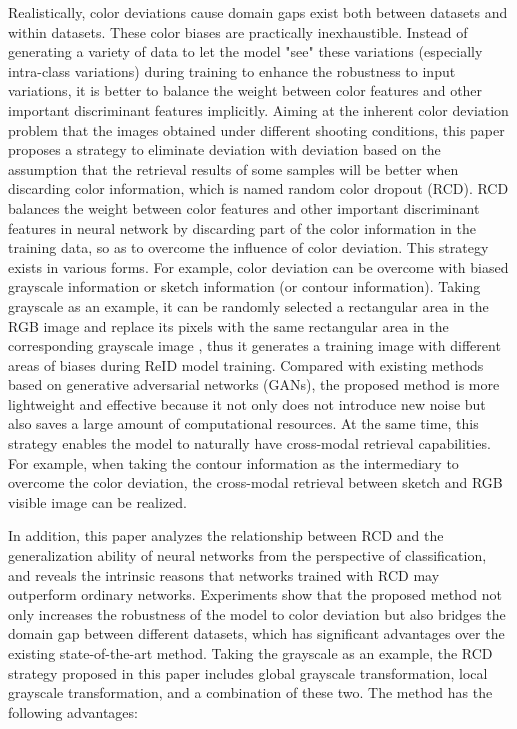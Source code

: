 \documentclass[10pt,twocolumn,letterpaper]{article}
\begin{document}
Realistically, color deviations cause domain gaps exist both between datasets and within datasets\cite{zheng2019joint,wei2018person}. These color biases are practically inexhaustible. Instead of generating a variety of data to let the model "see" these variations (especially intra-class variations)\cite{zheng2019joint} during training to enhance the robustness to input variations, it is better to balance the weight between color features and other important discriminant features implicitly. Aiming at the inherent color deviation problem that the images obtained under different shooting conditions, this paper proposes a strategy to eliminate deviation with deviation based on the assumption that the retrieval results of some samples will be better when discarding color information, which is named random color dropout (RCD). RCD balances the weight between color features and other important discriminant features in neural network by discarding part of the color information in the training data, so as to overcome the influence of color deviation. This strategy exists in various forms. For example, color deviation can be overcome with biased grayscale information or sketch information (or contour information). Taking grayscale as an example, it can be randomly selected a rectangular area in the RGB image and replace its pixels with the same rectangular area in the corresponding grayscale image , thus it generates a training image with different areas of biases during ReID model training. Compared with existing methods based on generative adversarial networks (GANs)\cite{goodfellow2014generative,zheng2019joint,wei2018person,zhong2018camera,deng2018image,liu2018pose,qian2018pose}, the proposed method is more lightweight and effective because it not only does not introduce new noise but also saves a large amount of computational resources. At the same time, this strategy enables the model to naturally have cross-modal retrieval\cite{sketch-criminal,sketch-based,zhu2020hetero,huang2022modality,ye2018visible,li2020infrared} capabilities. For example, when taking the contour information as the intermediary to overcome the color deviation, the cross-modal retrieval between sketch and RGB visible image can be realized.

In addition, this paper analyzes the relationship between RCD and the generalization ability of neural networks from the perspective of classification, and reveals the intrinsic reasons that networks trained with RCD may outperform ordinary networks. Experiments show that the proposed method not only increases the robustness of the model to color deviation but also bridges the domain gap between different datasets, which has significant advantages over the existing state-of-the-art method. Taking the grayscale as an example, the RCD strategy proposed in this paper includes global grayscale transformation, local grayscale transformation, and a combination of these two. The method has the following advantages:
\end{document}
